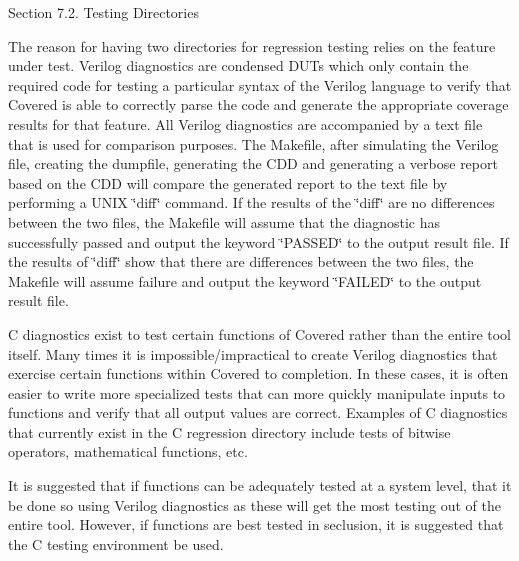\begin{Desc}
\item[Section 7.2. Testing Directories]\end{Desc}
\begin{Desc}
\item[]The reason for having two directories for regression testing relies on the feature under test. Verilog diagnostics are condensed DUTs which only contain the required code for testing a particular syntax of the Verilog language to verify that Covered is able to correctly parse the code and generate the appropriate coverage results for that feature. All Verilog diagnostics are accompanied by a text file that is used for comparison purposes. The Makefile, after simulating the Verilog file, creating the dumpfile, generating the CDD and generating a verbose report based on the CDD will compare the generated report to the text file by performing a UNIX \char`\"{}diff\char`\"{} command. If the results of the \char`\"{}diff\char`\"{} are no differences between the two files, the Makefile will assume that the diagnostic has successfully passed and output the keyword \char`\"{}PASSED\char`\"{} to the output result file. If the results of \char`\"{}diff\char`\"{} show that there are differences between the two files, the Makefile will assume failure and output the keyword \char`\"{}FAILED\char`\"{} to the output result file.\end{Desc}
\begin{Desc}
\item[]C diagnostics exist to test certain functions of Covered rather than the entire tool itself. Many times it is impossible/impractical to create Verilog diagnostics that exercise certain functions within Covered to completion. In these cases, it is often easier to write more specialized tests that can more quickly manipulate inputs to functions and verify that all output values are correct. Examples of C diagnostics that currently exist in the C regression directory include tests of bitwise operators, mathematical functions, etc.\end{Desc}
\begin{Desc}
\item[]It is suggested that if functions can be adequately tested at a system level, that it be done so using Verilog diagnostics as these will get the most testing out of the entire tool. However, if functions are best tested in seclusion, it is suggested that the C testing environment be used.\end{Desc}




